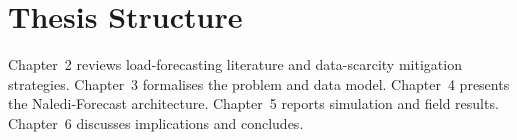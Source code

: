 \section{Thesis Structure}
Chapter~2 reviews load-forecasting literature and data-scarcity mitigation strategies.
Chapter~3 formalises the problem and data model. Chapter~4 presents the Naledi-Forecast
architecture. Chapter~5 reports simulation and field results. Chapter~6 discusses
implications and concludes.

